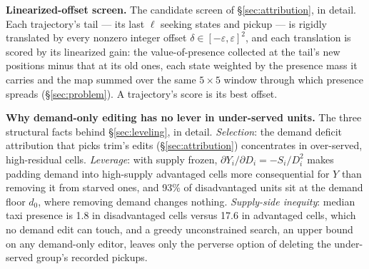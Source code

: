 \textbf{Linearized-offset screen.} The candidate screen of
\S\ref{sec:attribution}, in detail. Each trajectory's tail --- its last
$\ell$ seeking states and pickup --- is rigidly translated by every nonzero
integer offset $\delta \in [-\varepsilon, \varepsilon]^{2}$, and each
translation is scored by its linearized gain: the value-of-presence
collected at the tail's new positions minus that at its old ones, each state
weighted by the presence mass it carries and the map summed over the same
$5{\times}5$ window through which presence spreads (\S\ref{sec:problem}). A
trajectory's score is its best offset.

\textbf{Why demand-only editing has no lever in under-served units.} The three
structural facts behind \S\ref{sec:leveling}, in detail. \emph{Selection}: the
demand deficit attribution that picks trim's edits (\S\ref{sec:attribution})
concentrates in over-served, high-residual cells. \emph{Leverage}: with supply frozen,
$\partial Y_i / \partial D_i = -S_i / D_i^{2}$ makes padding demand into
high-supply advantaged cells more consequential for $Y$ than removing it from starved
ones, and 93\% of disadvantaged units sit at the demand floor $d_0$, where
removing demand changes nothing. \emph{Supply-side inequity}: median taxi
presence is 1.8 in disadvantaged cells versus 17.6 in advantaged cells, which
no demand edit can touch, and a greedy unconstrained search, an upper bound on
any demand-only editor, leaves only the perverse option of deleting the
under-served group's recorded pickups.

